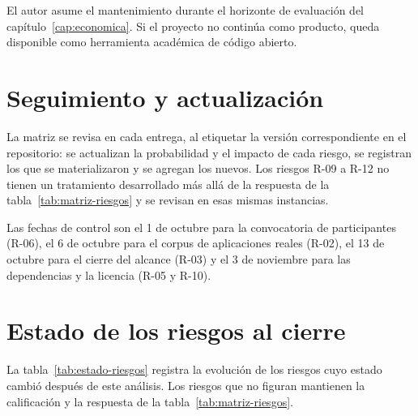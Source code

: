 El autor asume el mantenimiento durante el horizonte de evaluación del capítulo~\ref{cap:economica}. Si el proyecto no continúa como producto, queda disponible como herramienta académica de código abierto.

\section{Seguimiento y actualización}\label{sec:n6.7}

La matriz se revisa en cada entrega, al etiquetar la versión correspondiente en el repositorio: se actualizan la probabilidad y el impacto de cada riesgo, se registran los que se materializaron y se agregan los nuevos. Los riesgos R-09 a R-12 no tienen un tratamiento desarrollado más allá de la respuesta de la tabla~\ref{tab:matriz-riesgos} y se revisan en esas mismas instancias.

Las fechas de control son el 1 de octubre para la convocatoria de participantes (R-06), el 6 de octubre para el corpus de aplicaciones reales (R-02), el 13 de octubre para el cierre del alcance (R-03) y el 3 de noviembre para las dependencias y la licencia (R-05 y R-10).

\section{Estado de los riesgos al cierre}\label{sec:n6.8}

La tabla~\ref{tab:estado-riesgos} registra la evolución de los riesgos cuyo estado cambió después de este análisis. Los riesgos que no figuran mantienen la calificación y la respuesta de la tabla~\ref{tab:matriz-riesgos}.

